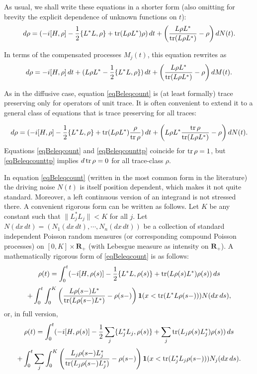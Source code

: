 \documentclass[12pt]{article}
\def\R{\mathbf{R}}
\def\1{\mathbf{1}}
\def\tr{\rm{tr}}
\begin{document}
As usual, we shall write these equations in a shorter form
(also omitting for brevity the explicit dependence of unknown functions on $t$):
 \begin{equation}
\label{eqBeleqcount}
d\rho=(- i[H, \rho] -\frac12 \{L^*L,\rho\}+ {\tr} (L\rho L^*) \rho ) \, dt
+\left(\frac{L\rho L^*}{{\tr} (L\rho L^*)}-\rho\right) dN(t).
\end{equation}

In terms of the compensated processes $M_j(t)$, this equation rewrites as
\begin{equation}
\label{eqBeleqcountm1}
d\rho=- i[H, \rho]\, dt +(L\rho L^*-\frac12 \{L^*L,\rho\} ) \, dt
+\left(\frac{L\rho L^*}{{\tr} (L\rho L^*)}-\rho\right) dM(t).
\end{equation}

As in the diffusive case, equation \eqref{eqBeleqcount} is (at least formally) trace preserving
only for operators of unit trace. It is often convenient to extend it to a general class of equations
that is trace preserving for all traces:

\begin{equation}
\label{eqBeleqcounttp}
d\rho=(- i[H, \rho] -\frac12 \{L^*L,\rho\}+ {\tr} (L\rho L^*) \frac{\rho}{{\tr}\, \rho} ) \, dt
+\left( L\rho L^*  \frac{{\tr}\, \rho}{{\tr} (L\rho L^*)}-\rho\right) dN(t).
\end{equation}
Equations \eqref{eqBeleqcount} and \eqref{eqBeleqcounttp} coincide for ${\tr}\,\rho=1$,
but \eqref{eqBeleqcounttp} implies $d\,{\tr}\, \rho=0$ for all trace-class $\rho$.


In equation \eqref{eqBeleqcount} (written in the most common form in the literature)
the driving noise $N(t)$ is itself
position dependent, which makes it not quite standard.
Moreover, a left continuous version of an integrand is not stressed there.
A convenient rigorous
form can be written as follows. Let $K$ be any constant such that $ \| L_j^*L_j \| <K$ for all $j$.
Let $N(dx \, dt)=(N_1(dx \, dt), \cdots, N_n(dx\, dt))$ be a collection of standard independent
Poisson random measures (or corresponding compound Poisson processes)
on $[0,K]\times \R_+$ (with Lebesgue measure
as intensity on $\R_+$). A mathematically rigorous form of \eqref{eqBeleqcount} is as follows:
\[
\rho (t)=\int_0^t (- i[H, \rho(s)] -\frac12 \{L^*L,\rho(s)\}+ {\tr} (L\rho(s) L^*) \rho(s) )\, ds
\]
\begin{equation}
\label{eqBeleqcountind}
+\int_0^t \int_0^K \left(\frac{L\rho(s-) L^*}{{\tr} (L\rho(s-) L^*)}-\rho(s-)\right)
\1(x< {\tr} (L^*L\rho(s-))) N(dx\, ds),
\end{equation}
or, in full version,
 \[
\rho (t)=\int_0^t (- i[H, \rho(s)] -\frac12 \sum_j \{L_j^*L_j,\rho(s)\}
+ \sum_j {\tr} (L_j\rho(s) L_j^*) \rho(s) )\, ds
\]
\[
+\int_0^t \sum_j \int_0^K \left(\frac{L_j\rho(s-) L_j^*}{{\tr} (L_j\rho(s-) L_j^*)}-\rho(s-)\right)
\1(x< {\tr} (L_j^*L_j\rho(s-))) N_j(dx\, ds).
\]
\end{document}
